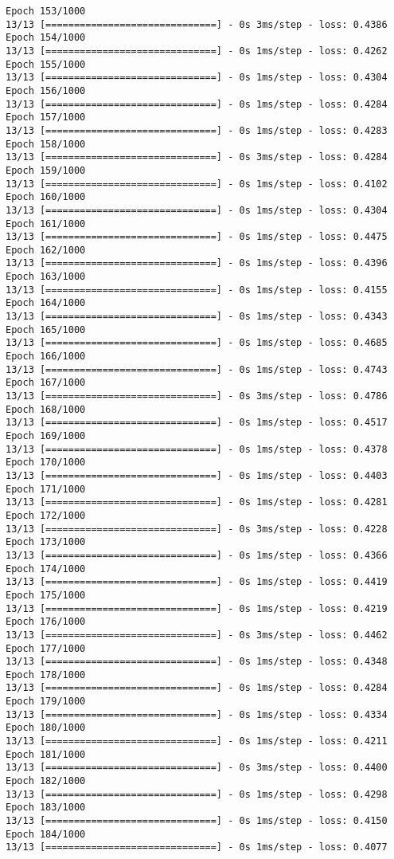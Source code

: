 \documentclass[11pt]{article}
\begin{document}
\begin{Verbatim}[commandchars=\\\{\}]
Epoch 153/1000
13/13 [==============================] - 0s 3ms/step - loss: 0.4386
Epoch 154/1000
13/13 [==============================] - 0s 1ms/step - loss: 0.4262
Epoch 155/1000
13/13 [==============================] - 0s 1ms/step - loss: 0.4304
Epoch 156/1000
13/13 [==============================] - 0s 1ms/step - loss: 0.4284
Epoch 157/1000
13/13 [==============================] - 0s 1ms/step - loss: 0.4283
Epoch 158/1000
13/13 [==============================] - 0s 3ms/step - loss: 0.4284
Epoch 159/1000
13/13 [==============================] - 0s 1ms/step - loss: 0.4102
Epoch 160/1000
13/13 [==============================] - 0s 1ms/step - loss: 0.4304
Epoch 161/1000
13/13 [==============================] - 0s 1ms/step - loss: 0.4475
Epoch 162/1000
13/13 [==============================] - 0s 1ms/step - loss: 0.4396
Epoch 163/1000
13/13 [==============================] - 0s 1ms/step - loss: 0.4155
Epoch 164/1000
13/13 [==============================] - 0s 1ms/step - loss: 0.4343
Epoch 165/1000
13/13 [==============================] - 0s 1ms/step - loss: 0.4685
Epoch 166/1000
13/13 [==============================] - 0s 1ms/step - loss: 0.4743
Epoch 167/1000
13/13 [==============================] - 0s 3ms/step - loss: 0.4786
Epoch 168/1000
13/13 [==============================] - 0s 1ms/step - loss: 0.4517
Epoch 169/1000
13/13 [==============================] - 0s 1ms/step - loss: 0.4378
Epoch 170/1000
13/13 [==============================] - 0s 1ms/step - loss: 0.4403
Epoch 171/1000
13/13 [==============================] - 0s 1ms/step - loss: 0.4281
Epoch 172/1000
13/13 [==============================] - 0s 3ms/step - loss: 0.4228
Epoch 173/1000
13/13 [==============================] - 0s 1ms/step - loss: 0.4366
Epoch 174/1000
13/13 [==============================] - 0s 1ms/step - loss: 0.4419
Epoch 175/1000
13/13 [==============================] - 0s 1ms/step - loss: 0.4219
Epoch 176/1000
13/13 [==============================] - 0s 3ms/step - loss: 0.4462
Epoch 177/1000
13/13 [==============================] - 0s 1ms/step - loss: 0.4348
Epoch 178/1000
13/13 [==============================] - 0s 1ms/step - loss: 0.4284
Epoch 179/1000
13/13 [==============================] - 0s 1ms/step - loss: 0.4334
Epoch 180/1000
13/13 [==============================] - 0s 1ms/step - loss: 0.4211
Epoch 181/1000
13/13 [==============================] - 0s 3ms/step - loss: 0.4400
Epoch 182/1000
13/13 [==============================] - 0s 1ms/step - loss: 0.4298
Epoch 183/1000
13/13 [==============================] - 0s 1ms/step - loss: 0.4150
Epoch 184/1000
13/13 [==============================] - 0s 1ms/step - loss: 0.4077

\end{Verbatim}
\end{document}
